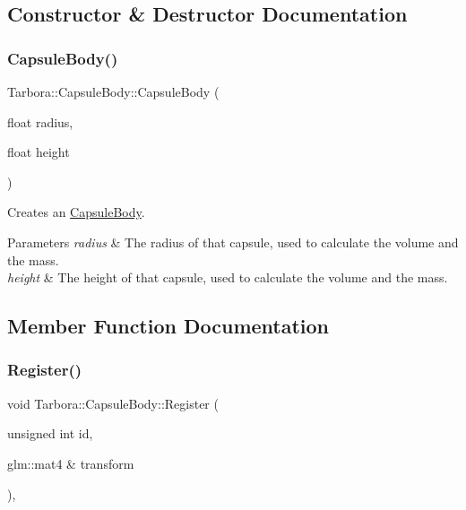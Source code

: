 \subsection{Constructor \& Destructor Documentation}
\mbox{\label{classTarbora_1_1CapsuleBody_ac7427a8fd201d1eb99944d48619e78ed}} 
\subsubsection{\texorpdfstring{Capsule\+Body()}{CapsuleBody()}}
{\footnotesize\ttfamily Tarbora\+::\+Capsule\+Body\+::\+Capsule\+Body (\begin{DoxyParamCaption}\item[{float}]{radius,  }\item[{float}]{height }\end{DoxyParamCaption})}



Creates an \hyperlink{classTarbora_1_1CapsuleBody}{Capsule\+Body}. 


\begin{DoxyParams}{Parameters}
{\em radius} & The radius of that capsule, used to calculate the volume and the mass. \\
\hline
{\em height} & The height of that capsule, used to calculate the volume and the mass. \\
\hline
\end{DoxyParams}


\subsection{Member Function Documentation}
\mbox{\label{classTarbora_1_1CapsuleBody_a1083e8df5302931850b34a9c9ec764e6}} 
\subsubsection{\texorpdfstring{Register()}{Register()}}
{\footnotesize\ttfamily void Tarbora\+::\+Capsule\+Body\+::\+Register (\begin{DoxyParamCaption}\item[{unsigned int}]{id,  }\item[{glm\+::mat4 \&}]{transform }\end{DoxyParamCaption})\hspace{0.3cm}{\ttfamily [override]}, {\ttfamily [virtual]}}



